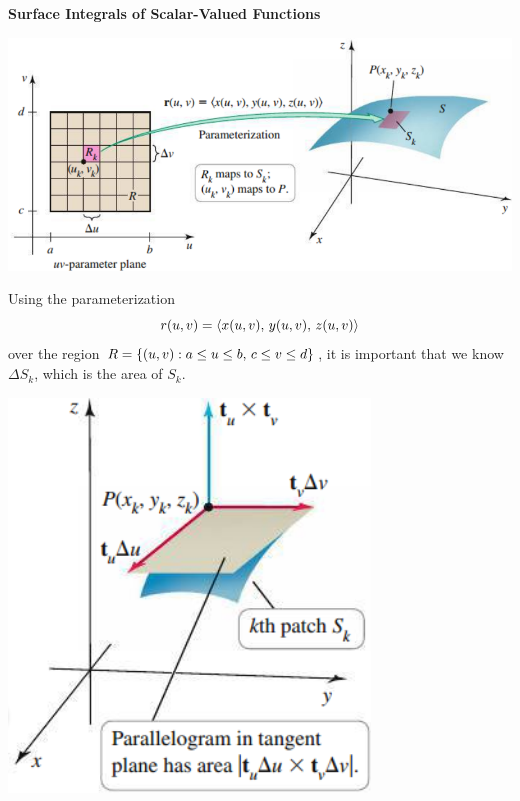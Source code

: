 \documentclass[mathNotesPreamble]{subfiles}
\begin{document}
  \noindent
  \textbf{Surface Integrals  of Scalar-Valued Functions}

  \begin{center}
    \includegraphics[width=0.8\linewidth]{images/briggs_17_06/fig17_47}
  \end{center}
  Using the parameterization 
    \[r(u,v)={\left\langle x(u,v),\, y(u,v),\,z(u,v) \right\rangle}\]
  over the region $R={\left\{(u,v): a\leq u\leq b,\, c\leq v\leq d\right\}}$, it is important that we know $\Delta S_k$, which is the area of $S_k$.
  \begin{center}
    \includegraphics[width=0.35\linewidth]{images/briggs_17_06/fig17_48}
  \end{center}
  \pagebreak
\end{document}
